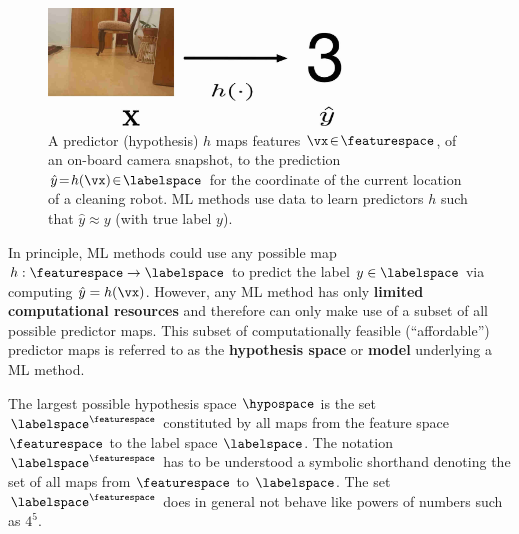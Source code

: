 \documentclass[12pt]{report}
\begin{document}
\begin{figure}[htbp]
%   
\begin{minipage}{\textwidth}
\begin{center}
   \includegraphics[width=0.7\textwidth]{HypoMap1.jpg}  
   \end{center}
\end{minipage}
\caption{A predictor (hypothesis) $h$ maps features $\vx\!\in\!\featurespace$, of 
	an on-board camera snapshot, to the prediction $\hat{y}\!=\!h(\vx)\!\in\!\labelspace$ 
	for the coordinate of the current location of a cleaning robot. ML methods use data 
	to learn predictors $h$ such that $\hat{y}\!\approx\!y$ (with true label $y$).}
\label{fig_feature_map_eval}
\end{figure}

In principle, ML methods could use any possible map $h: \featurespace \rightarrow \labelspace$ 
to predict the label $y \in \labelspace$ via computing $\hat{y} = h(\vx)$. 
However, any ML method has only {\bf limited computational resources} 
and therefore can only make use of a subset of all possible predictor maps. 
This subset of computationally feasible (``affordable'') predictor maps 
is referred to as the {\bf hypothesis space} or {\bf model} underlying 
a ML method. 

The largest possible hypothesis space $\hypospace$ is the set 
$\labelspace^{\featurespace}$ constituted by all maps from the 
feature space $\featurespace$ to the label space $\labelspace$.
The notation $\labelspace^{\featurespace}$ has to be understood 
a symbolic shorthand denoting the set of all maps from $\featurespace$ to $\labelspace$. 
The set $\labelspace^{\featurespace}$ does in general not behave like 
powers of numbers such as $4^5$. 
\end{document}
